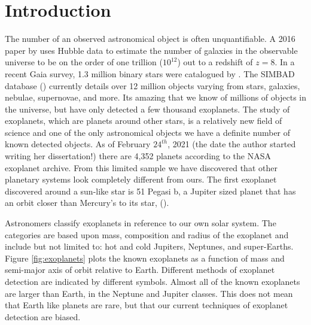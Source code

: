 \chapter{Introduction}
 
The number of an observed astronomical object is often unquantifiable. A 2016 paper by \cite{conselice2016evolution} uses Hubble data to estimate the number of galaxies in the observable universe to be on the order of one trillion ($10^{12}$) out to a redshift of $z=8$. In a recent Gaia survey, 1.3 million binary stars were catalogued by \cite{el2101million}. The SIMBAD database (\cite{wenger2000simbad}) currently details over 12 million objects varying from stars, galaxies, nebulae, supernovae, and more. Its amazing that we know of millions of objects in the universe, but have only detected a few thousand exoplanets. The study of exoplanets, which are planets around other stars, is a relatively new field of science and one of the only astronomical objects we have a definite number of known detected objects. As of February $24^{th}$, 2021 (the date the author started writing her dissertation!) there are 4,352 planets according to the NASA exoplanet archive. From this limited sample we have discovered that other planetary systems look completely different from ours. The first exoplanet discovered around a sun-like star is 51 Pegasi b, a Jupiter sized planet that has an orbit closer than Mercury's to its star, (\cite{mayor1995jupiter}). 

Astronomers classify exoplanets in reference to our own solar system. The categories are based upon mass, composition and radius of the exoplanet and include but not limited to: hot and cold Jupiters, Neptunes, and super-Earths. Figure \ref{fig:exoplanets} plots the known exoplanets as a function of mass and semi-major axis of orbit relative to Earth. Different methods of exoplanet detection are indicated by different symbols. Almost all of the known exoplanets are larger than Earth, in the Neptune and Jupiter classes. This does not mean that Earth like planets are rare, but that our current techniques of exoplanet detection are biased.

